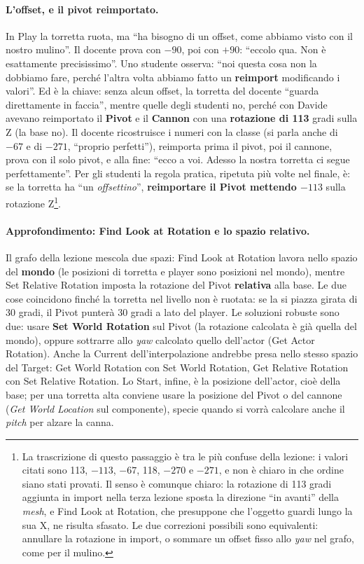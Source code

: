 \paragraph{L'offset, e il pivot reimportato.} In Play la torretta ruota, ma ``ha
bisogno di un offset, come abbiamo visto con il nostro mulino''. Il docente prova con
$-90$, poi con $+90$: ``eccolo qua. Non è esattamente precisissimo''. Uno studente
osserva: ``noi questa cosa non la dobbiamo fare, perché l'altra volta abbiamo fatto un
\textbf{reimport} modificando i valori''. Ed è la chiave: senza alcun offset, la
torretta del docente ``guarda direttamente in faccia'', mentre quelle degli studenti no,
perché con Davide avevano reimportato il \textbf{Pivot} e il \textbf{Cannon} con una
\textbf{rotazione di 113} gradi sulla Z (la base no). Il docente ricostruisce i numeri
con la classe (si parla anche di $-67$ e di $-271$, ``proprio perfetti''), reimporta
prima il pivot, poi il cannone, prova con il solo pivot, e alla fine: ``ecco a voi.
Adesso la nostra torretta ci segue perfettamente''. Per gli studenti la regola pratica,
ripetuta più volte nel finale, è: se la torretta ha ``un \emph{offsettino}'',
\textbf{reimportare il Pivot mettendo $-113$} sulla rotazione Z\footnote{La trascrizione
di questo passaggio è tra le più confuse della lezione: i valori citati sono 113, $-113$,
$-67$, 118, $-270$ e $-271$, e non è chiaro in che ordine siano stati provati. Il senso
è comunque chiaro: la rotazione di 113 gradi aggiunta in import nella terza lezione
sposta la direzione ``in avanti'' della \emph{mesh}, e Find Look at Rotation, che
presuppone che l'oggetto guardi lungo la sua X, ne risulta sfasato. Le due correzioni
possibili sono equivalenti: annullare la rotazione in import, o sommare un offset fisso
allo \emph{yaw} nel grafo, come per il mulino.}.

\paragraph{Approfondimento: Find Look at Rotation e lo spazio relativo.} Il grafo della
lezione mescola due spazi: Find Look at Rotation lavora nello spazio del
\textbf{mondo} (le posizioni di torretta e player sono posizioni nel mondo), mentre
Set Relative Rotation imposta la rotazione del Pivot \textbf{relativa} alla base. Le
due cose coincidono finché la torretta nel livello non è ruotata: se la si piazza
girata di 30 gradi, il Pivot punterà 30 gradi a lato del player. Le soluzioni robuste
sono due: usare \textbf{Set World Rotation} sul Pivot (la rotazione calcolata è già
quella del mondo), oppure sottrarre allo \emph{yaw} calcolato quello dell'actor (Get
Actor Rotation). Anche la Current dell'interpolazione andrebbe presa nello stesso
spazio del Target: Get World Rotation con Set World Rotation, Get Relative Rotation con
Set Relative Rotation. Lo Start, infine, è la posizione dell'actor, cioè della base; per
una torretta alta conviene usare la posizione del Pivot o del cannone (\emph{Get World
Location} sul componente), specie quando si vorrà calcolare anche il \emph{pitch} per
alzare la canna.

